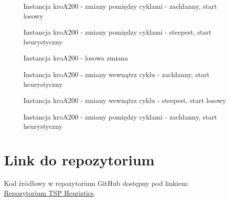 \documentclass[11pt]{article}
\begin{document}
\begin{figure}[H]
    \centering
    \caption{Instancja kroA200 - zmiany pomiędzy cyklami - zachłanny, start losowy}
    \label{fig:Greedy-cycle-changes-kroA-intercycle-random}
\end{figure}

\begin{figure}[H]
    \centering
    \caption{Instancja kroA200 - zmiany pomiędzy cyklami - steepest, start heurystyczny}
    \label{fig:Steepest-cycle-changes-kroA-intercycle-heuristic}
\end{figure}

\begin{figure}[H]
    \centering
    \caption{Instancja kroA200 - losowa zmiana}
    \label{fig:Random-path-kroA}
\end{figure}

\begin{figure}[H]
    \centering
    \caption{Instancja kroA200 - zmiany wewnątrz cyklu - zachłanny, start heurystyczny}
    \label{fig:Greedy-cycle-changes-kroA-heuristic}
\end{figure}

\begin{figure}[H]
    \centering
    \caption{Instancja kroA200 - zmiany wewnątrz cyklu - steepest, start losowy}
    \label{fig:Steepest-cycle-changes-kroA-random}
\end{figure}

\begin{figure}[H]
    \centering
    \caption{Instancja kroA200 - zmiany pomiędzy cyklami - zachłanny, start heurystyczny}
    \label{fig:Greedy-cycle-changes-kroA-intercycle-heuristic}
\end{figure}


\section{Link do repozytorium}\label{sec:link-do-repo}
Kod źródłowy w repozytorium GitHub dostępny pod linkiem: \\
\href{https://github.com/KotZPolibudy/PUT_IMO/tree/main/Local_search}{Repozytorium TSP Heuristics}.
\end{document}
